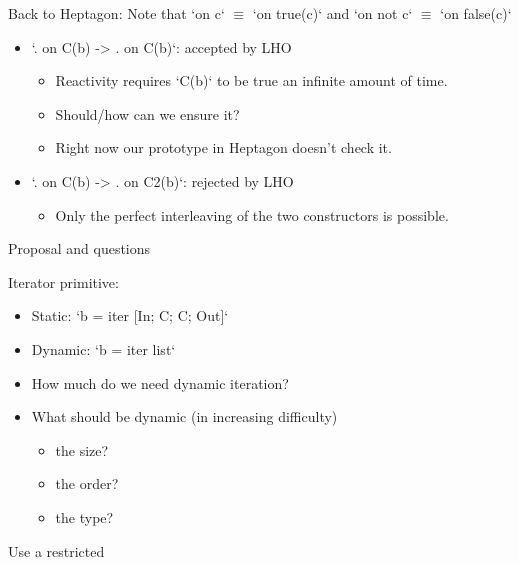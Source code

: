 \documentclass[xcolor=dvipsnames]{beamer}
\begin{document}
\begin{frame}[fragile]{Back to Heptagon:}
Note that `on c` $\equiv$ `on true(c)` and `on not c` $\equiv$ `on false(c)`
\begin{block}{}
\begin{itemize}
  \item `. on C(b) -> . on C(b)`: accepted by LHO
    \begin{itemize}
      \item Reactivity requires `C(b)` to be true an infinite amount of time.
      \item Should/how can we ensure it?
      \item Right now our prototype in Heptagon doesn't check it.
    \end{itemize} 
  \item `. on C(b) -> . on C2(b)`: rejected by LHO
    \begin{itemize}
      \item Only the perfect interleaving of the two constructors is possible.
    \end{itemize}
\end{itemize}
\end{block}
\end{frame}

\begin{frame}[fragile]{Proposal and questions}
\begin{block}{Iterator primitive:}
\begin{itemize}
  \item Static: `b = iter [In; C; C; Out]`
  \item Dynamic: `b = iter list`
\end{itemize}
\end{block}
\begin{block}{}
\begin{itemize}
  \item How much do we need dynamic iteration?
  \item What should be dynamic (in increasing difficulty)
    \begin{itemize}
      \item the size?
      \item the order?
      \item the type?
  \end{itemize}
\end{itemize}
\end{block}
\begin{block}
Use a restricted 
\end{block}
\end{frame}
\end{document}

